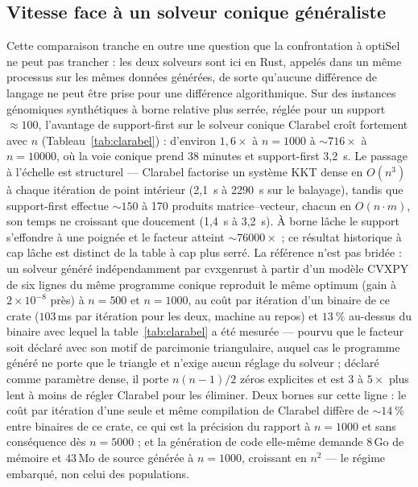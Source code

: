 \documentclass[11pt]{article}
\begin{document}
\subsection{Vitesse face à un solveur conique généraliste}\label{sec:clarabel}

Cette comparaison tranche en outre une question que la confrontation à optiSel ne peut pas trancher : les deux solveurs sont ici en Rust, appelés dans un même processus sur les mêmes données générées, de sorte qu'aucune différence de langage ne peut être prise pour une différence algorithmique. Sur des instances génomiques synthétiques à borne relative plus serrée, réglée pour un support ${\approx}100$, l'avantage de support-first sur le solveur conique Clarabel croît fortement avec $n$ (Tableau~\ref{tab:clarabel}) : d'environ $1{,}6\times$ à $n=1000$ à ${\sim}716\times$ à $n=10000$, où la voie conique prend 38 minutes et support-first 3,2~s. Le passage à l'échelle est structurel --- Clarabel factorise un système KKT dense en $O(n^3)$ à chaque itération de point intérieur (2,1~s à 2290~s sur le balayage), tandis que support-first effectue ${\sim}150$ à 170 produits matrice--vecteur, chacun en $O(n\cdot m)$, son temps ne croissant que doucement (1,4~s à 3,2~s). À borne lâche le support s'effondre à une poignée et le facteur atteint ${\sim}76000\times$ ; ce résultat historique à cap lâche est distinct de la table à cap plus serré. La référence n'est pas bridée : un solveur généré indépendamment par cvxgenrust à partir d'un modèle CVXPY de six lignes du même programme conique reproduit le même optimum (gain à $2\times10^{-8}$ près) à $n=500$ et $n=1000$, au coût par itération d'un binaire de ce crate ($103$\,ms par itération pour les deux, machine au repos) et $13~\%$ au-dessus du binaire avec lequel la table~\ref{tab:clarabel} a été mesurée --- pourvu que le facteur soit déclaré avec son motif de parcimonie triangulaire, auquel cas le programme généré ne porte que le triangle et n'exige aucun réglage du solveur ; déclaré comme paramètre dense, il porte $n(n-1)/2$ zéros explicites et est $3$ à $5\times$ plus lent à moins de régler Clarabel pour les éliminer. Deux bornes sur cette ligne : le coût par itération d'une seule et même compilation de Clarabel diffère de ${\sim}14~\%$ entre binaires de ce crate, ce qui est la précision du rapport à $n=1000$ et sans conséquence dès $n=5000$ ; et la génération de code elle-même demande $8$\,Go de mémoire et $43$\,Mo de source générée à $n=1000$, croissant en $n^2$ --- le régime embarqué, non celui des populations.
\end{document}

